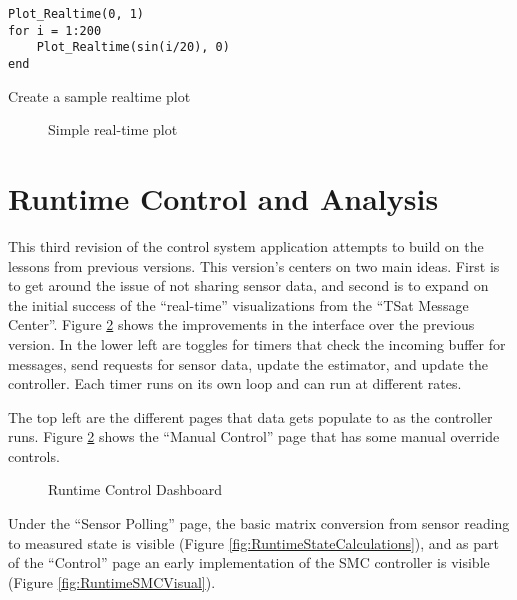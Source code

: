 \begin{listing}[H]
\begin{singlespace}
  \begin{verbatim}
Plot_Realtime(0, 1)
for i = 1:200
    Plot_Realtime(sin(i/20), 0)
end
  \end{verbatim}
\caption{Create a sample realtime plot}
\label{code:samplerealtimeplot}
\nocite{minted}
\end{singlespace}
\end{listing}
\begin{figure}[ht]
  \centerline{}
  \caption{Simple real-time plot}
  \label{fig:SimpleRealtime}
\end{figure}

\section{Runtime Control and Analysis}
\label{sec:RuntimeControlandAnalysis}

This third revision of the control system application attempts to build on the lessons from previous versions.  This version's centers on two main ideas.  First is to get around the issue of not sharing sensor data, and second is to expand on the initial success of the ``real-time'' visualizations from the ``TSat Message Center''.  Figure \ref{fig:RuntimeControlDashboard} shows the improvements in the interface over the previous version.  In the lower left are toggles for timers that check the incoming buffer for messages, send requests for sensor data, update the estimator, and update the controller.  Each timer runs on its own loop and can run at different rates.

The top left are the different pages that data gets populate to as the controller runs.  Figure \ref{fig:RuntimeControlDashboard} shows the ``Manual Control'' page that has some manual override controls.

\begin{figure}[H]
  \centerline{}
  \caption{Runtime Control Dashboard}
  \label{fig:RuntimeControlDashboard}
\end{figure}

Under the ``Sensor Polling'' page, the basic matrix conversion from sensor reading to measured state is visible (Figure \ref{fig:RuntimeStateCalculations}), and as part of the ``Control'' page an early implementation of the SMC controller is visible (Figure \ref{fig:RuntimeSMCVisual}).

